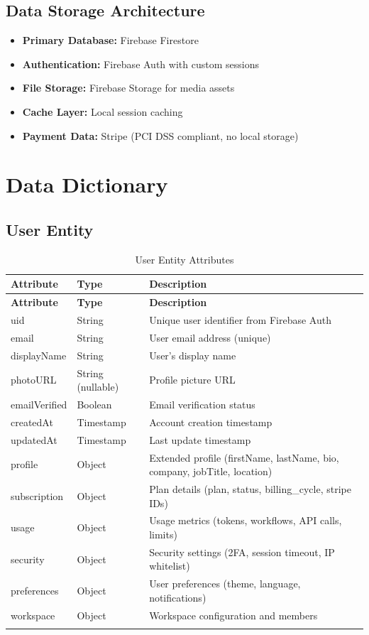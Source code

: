 \documentclass[12pt,a4paper]{article}
\begin{document}
\subsection{Data Storage Architecture}
\begin{itemize}
    \item \textbf{Primary Database:} Firebase Firestore
    \item \textbf{Authentication:} Firebase Auth with custom sessions
    \item \textbf{File Storage:} Firebase Storage for media assets
    \item \textbf{Cache Layer:} Local session caching
    \item \textbf{Payment Data:} Stripe (PCI DSS compliant, no local storage)
\end{itemize}

\newpage

\section{Data Dictionary}

\subsection{User Entity}
\begin{longtable}{|p{4cm}|p{3cm}|p{7cm}|}
\hline
\textbf{Attribute} & \textbf{Type} & \textbf{Description}\\
\hline
\endfirsthead
\hline
\textbf{Attribute} & \textbf{Type} & \textbf{Description}\\
\hline
\endhead
uid & String & Unique user identifier from Firebase Auth\\
\hline
email & String & User email address (unique)\\
\hline
displayName & String & User's display name\\
\hline
photoURL & String (nullable) & Profile picture URL\\
\hline
emailVerified & Boolean & Email verification status\\
\hline
createdAt & Timestamp & Account creation timestamp\\
\hline
updatedAt & Timestamp & Last update timestamp\\
\hline
profile & Object & Extended profile (firstName, lastName, bio, company, jobTitle, location)\\
\hline
subscription & Object & Plan details (plan, status, billing\_cycle, stripe IDs)\\
\hline
usage & Object & Usage metrics (tokens, workflows, API calls, limits)\\
\hline
security & Object & Security settings (2FA, session timeout, IP whitelist)\\
\hline
preferences & Object & User preferences (theme, language, notifications)\\
\hline
workspace & Object & Workspace configuration and members\\
\hline
\caption{User Entity Attributes}
\end{longtable}
\end{document}
